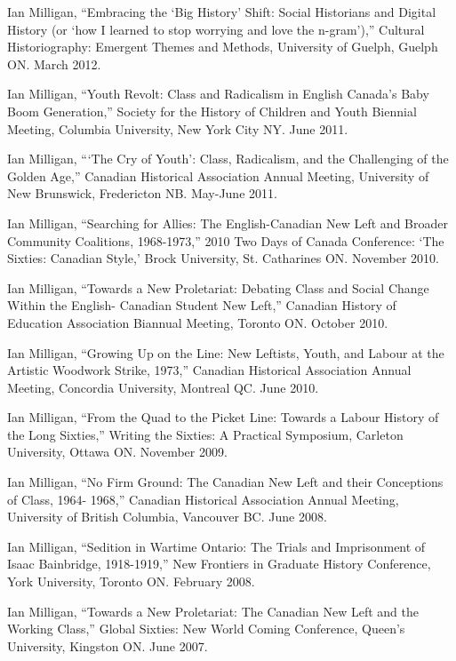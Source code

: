 \documentclass[11pt,article,oneside]{memoir}
\begin{document}
\ind Ian Milligan, ``Embracing the `Big History' Shift: Social Historians and Digital History (or `how I learned to stop worrying and love the n-gram'),'' Cultural Historiography: Emergent Themes and Methods, University of Guelph, Guelph ON. March 2012.

\ind Ian Milligan, ``Youth Revolt: Class and Radicalism in English Canada's Baby Boom Generation,'' Society for the History of Children and Youth Biennial Meeting, Columbia University, New York City NY. June 2011.

\ind Ian Milligan, ```The Cry of Youth': Class, Radicalism, and the Challenging of the Golden Age,'' Canadian Historical Association Annual Meeting, University of New Brunswick, Fredericton NB. May-June 2011.

\ind Ian Milligan, ``Searching for Allies: The English-Canadian New Left and Broader Community Coalitions, 1968-1973,'' 2010 Two Days of Canada Conference: `The Sixties: Canadian Style,' Brock University, St. Catharines ON. November 2010.

\ind Ian Milligan, ``Towards a New Proletariat: Debating Class and Social Change Within the English- Canadian Student New Left,'' Canadian History of Education Association Biannual Meeting, Toronto ON. October 2010.

\ind Ian Milligan, ``Growing Up on the Line: New Leftists, Youth, and Labour at the Artistic Woodwork Strike, 1973,'' Canadian Historical Association Annual Meeting, Concordia University, Montreal QC. June 2010.

\ind Ian Milligan, ``From the Quad to the Picket Line: Towards a Labour History of the Long Sixties,'' Writing the Sixties: A Practical Symposium, Carleton University, Ottawa ON. November 2009.

\ind Ian Milligan, ``No Firm Ground: The Canadian New Left and their Conceptions of Class, 1964- 1968,'' Canadian Historical Association Annual Meeting, University of British Columbia, Vancouver BC. June 2008.

\ind Ian Milligan, ``Sedition in Wartime Ontario: The Trials and Imprisonment of Isaac Bainbridge, 1918-1919,'' New Frontiers in Graduate History Conference, York University, Toronto ON. February 2008.

\ind Ian Milligan, ``Towards a New Proletariat: The Canadian New Left and the Working Class,'' Global Sixties: New World Coming Conference, Queen's University, Kingston ON. June 2007.

\bigskip 

\medskip
\end{document}
